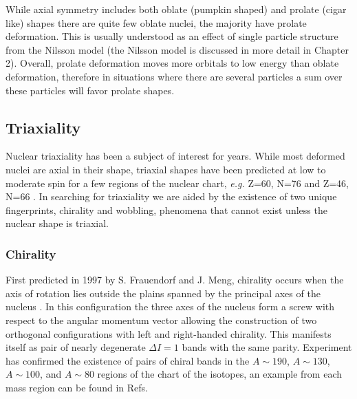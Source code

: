While axial symmetry includes both oblate (pumpkin shaped) and prolate (cigar like) shapes there are quite few oblate nuclei, the majority have prolate deformation. This is usually understood as an effect of single particle structure from the Nilsson model (the Nilsson model is discussed in more detail in Chapter 2). Overall, prolate deformation moves more orbitals to low energy than oblate deformation, therefore in situations where there are several particles a sum over these particles will favor prolate shapes.

\subsection{Triaxiality}
\label{ssec:intro-rot-triax}
Nuclear triaxiality has been a subject of interest for years. While most deformed nuclei are axial in their shape, triaxial shapes have been predicted at low to moderate spin for a few regions of the nuclear chart, \emph{e.g.} Z=60, N=76 and Z=46, N=66  \cite{groundStateTriax}. In searching for triaxiality we are aided by the existence of two unique fingerprints, chirality and wobbling, phenomena that cannot exist unless the nuclear shape is triaxial.

\subsubsection{Chirality}
\label{sssec:intro-rot-chiral}
First predicted in 1997  by S. Frauendorf and J. Meng, chirality occurs when the axis of rotation lies outside the plains spanned by the principal axes of the nucleus \cite{frauendorfChirality,frauendorfTAC,chiralityOfNuclearRotation}. In this configuration the three axes of the nucleus form a screw with respect to the angular momentum vector allowing the construction of two orthogonal configurations with left and right-handed chirality. This manifests itself as pair of nearly degenerate $\Delta{}I=1$ bands with the same parity. Experiment has confirmed the existence of pairs of chiral bands in the $A\sim{}190$, $A\sim{}130$, $A\sim{}100$, and  $A\sim{}80$ regions of the chart of the isotopes, an example from each mass region can be found in Refs. \cite{chiralityIn135Nd,chiralityIn104Rh,chiralityIn80Br,chiralityIn188Ir}

